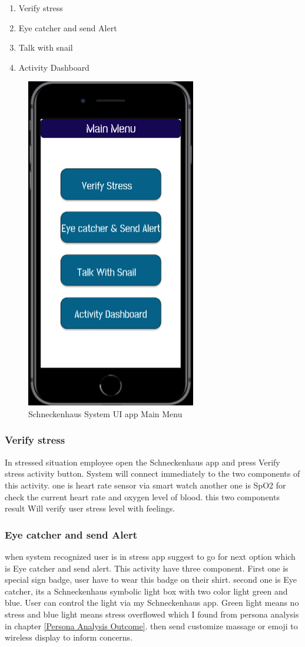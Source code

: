 \begin{enumerate}
    \item Verify stress
    \item Eye catcher and send Alert
    \item Talk with snail
    \item Activity Dashboard
\end{enumerate}

\begin{figure}[hbt!] 
  \centering
  \includegraphics[width=0.4\linewidth]{chap4/image4/SC2.png}
  \caption[Schneckenhaus System UI app Main Menu ]{Schneckenhaus System UI app Main Menu}
  \label{fig:main_menu}
\end{figure}

\subsubsection*{Verify stress}
In stressed situation employee open the Schneckenhaus app and press Verify stress activity button. System will connect immediately to the two components of this activity. one is heart rate sensor via smart watch another one is \acf{SpO2} for check the current heart rate and oxygen level of blood. this two components result Will verify user stress level with feelings. 
\subsubsection*{Eye catcher and send Alert}
when system recognized user is in stress app suggest to go for next option which is Eye catcher and send alert. This activity have three component. First one is special sign badge, user have to wear this badge on their shirt. second one is Eye catcher, its a Schneckenhaus symbolic light box with two color light green and blue. User can control the light via my Schneckenhaus app. Green light means no stress and blue light means stress overflowed which I found from persona analysis in chapter \ref{Persona Analysis Outcome}. then send customize massage or emoji to wireless display to inform concerns.
